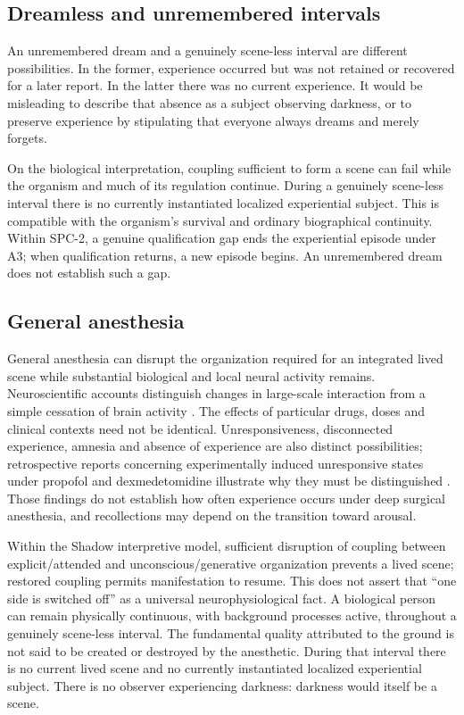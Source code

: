 \subsection{Dreamless and unremembered intervals}\label{sec:dreamless}
An unremembered dream and a genuinely scene-less interval are different possibilities. In the former, experience occurred but was not retained or recovered for a later report. In the latter there was no current experience. It would be misleading to describe that absence as a subject observing darkness, or to preserve experience by stipulating that everyone always dreams and merely forgets.

On the biological interpretation, coupling sufficient to form a scene can fail while the organism and much of its regulation continue. During a genuinely scene-less interval there is no currently instantiated localized experiential subject. This is compatible with the organism's survival and ordinary biographical continuity. Within SPC-2, a genuine qualification gap ends the experiential episode under A3; when qualification returns, a new episode begins. An unremembered dream does not establish such a gap.

\subsection{General anesthesia}\label{sec:general-anesthesia}
General anesthesia can disrupt the organization required for an integrated lived scene while substantial biological and local neural activity remains. Neuroscientific accounts distinguish changes in large-scale interaction from a simple cessation of brain activity \cite{Mashour2024}. The effects of particular drugs, doses and clinical contexts need not be identical. Unresponsiveness, disconnected experience, amnesia and absence of experience are also distinct possibilities; retrospective reports concerning experimentally induced unresponsive states under propofol and dexmedetomidine illustrate why they must be distinguished \cite{Scheinin2021}. Those findings do not establish how often experience occurs under deep surgical anesthesia, and recollections may depend on the transition toward arousal.

Within the Shadow interpretive model, sufficient disruption of coupling between explicit/attended and unconscious/generative organization prevents a lived scene; restored coupling permits manifestation to resume. This does not assert that ``one side is switched off'' as a universal neurophysiological fact. A biological person can remain physically continuous, with background processes active, throughout a genuinely scene-less interval. The fundamental quality attributed to the ground is not said to be created or destroyed by the anesthetic. During that interval there is no current lived scene and no currently instantiated localized experiential subject. There is no observer experiencing darkness: darkness would itself be a scene.

